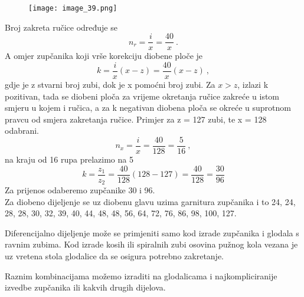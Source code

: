 \documentclass[a4paper,12pt]{article}
\numberwithin{figure}{section}
\begin{document}
\begin{figure}[!h]
\centering
\texttt{[image: image\_39.png]}
\end{figure}
\FloatBarrier
\noindent Broj zakreta ručice određuje se
\begin{equation*}
n_{r} = \frac{i}{x} = \frac{40}{x}\:.
\end{equation*}
A omjer zupčanika koji vrše korekciju diobene ploče je
\begin{equation*}
k = \frac{i}{x}(x-z) = \frac{40}{x}(x-z)\:,
\end{equation*}
gdje je z stvarni broj zubi, dok je x pomoćni broj zubi. Za $x>z$, izlazi k pozitivan, tada se diobeni ploča za vrijeme okretanja ručice zakreće u istom smjeru u kojem i ručica, a za k negativan diobena ploča se okreće u suprotnom pravcu od smjera zakretanja ručice.
Primjer za z = 127 zubi, te x = 128 odabrani.
\begin{equation*}
n_{x} = \frac{i}{x} = \frac{40}{128} = \frac{5}{16}\:,
\end{equation*} 
na kraju od 16 rupa prelazimo na 5
\begin{equation*}
k = \frac{z_{1}}{z_{2}} = \frac{40}{128} (128-127) = \frac{40}{128} = \frac{30}{96}
\end{equation*}
Za prijenos odaberemo zupčanike 30 i 96. \\
Za diobeno dijeljenje se uz diobenu glavu uzima garnitura zupčanika i to 24, 24, 28, 28, 30, 32, 39, 40, 44, 48, 48, 56, 64, 72, 76, 86, 98, 100, 127.\par
Diferencijalno dijeljenje može se primjeniti samo kod izrade zupčanika i glodala s ravnim zubima. Kod izrade kosih ili spiralnih zubi osovina pužnog kola vezana je uz vretena stola glodalice da se osigura potrebno zakretanje.\par
Raznim kombinacijama možemo izraditi na glodalicama i najkompliciranije izvedbe zupčanika ili kakvih drugih dijelova.
\end{document}
